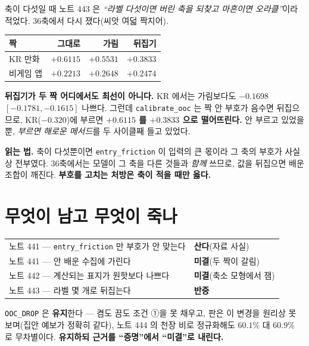 \documentclass[11pt]{article}
\begin{document}
축이 다섯일 때 노트 443 은 \emph{``라벨 다섯이면 버린 축을 되찾고 마흔이면
오라클''}이라 적었다. 36축에서 다시 쟀다(씨앗 여덟 짝지어).

\begin{center}
\begin{tabular}{lrrr}
\hline
짝 & 그대로 & 가림 & 뒤집기 \\
\hline
KR 만화 & $\mathbf{+0.6115}$ & $+0.5531$ & $+0.3833$ \\
비게임 앱 & $+0.2213$ & $\mathbf{+0.2648}$ & $+0.2474$ \\
\hline
\end{tabular}
\end{center}

\textbf{뒤집기가 두 짝 어디에서도 최선이 아니다.} KR 에서는 가림보다도
$-0.1698$ $[-0.1781,-0.1615]$ 나쁘다. 그런데 \texttt{calibrate\_ooc} 는
짝 안 부호가 음수면 뒤집으므로, KR($-0.320$)에 부르면
\textbf{$+0.6115$ 를 $+0.3833$ 으로 떨어뜨린다.} 안 부르고 있었을 뿐,
\emph{부르면 해로운 메서드}를 두 사이클째 들고 있었다.

\textbf{읽는 법.} 축이 다섯뿐이면 \texttt{entry\_friction} 이 입력의 큰
몫이라 그 축의 부호가 사실상 전부였다. 36축에서는 모델이 그 축을 다른
것들과 \emph{함께} 쓰므로, 값을 뒤집으면 배운 조합이 깨진다. \textbf{부호를
고치는 처방은 축이 적을 때만 옳다.}

\section{무엇이 남고 무엇이 죽나}

\begin{center}
\begin{tabular}{ll}
\hline
노트 441 --- \texttt{entry\_friction} 만 부호가 안 맞는다 & \textbf{산다}(자료 사실) \\
노트 441 --- 안 배운 수집에 가린다 & \textbf{미결}(두 짝이 갈림) \\
노트 442 --- 계산되는 표지가 원핫보다 나쁘다 & \textbf{미결}(축소 모형에서 잼) \\
노트 443 --- 라벨 몇 개로 뒤집는다 & \textbf{반증} \\
\hline
\end{tabular}
\end{center}

\texttt{OOC\_DROP} 은 \textbf{유지}한다 --- 켬도 끔도 조건 ①을 못 채우고,
판은 이 변경을 원리상 못 보며(집안 예보가 정확히 같다), 노트 444 의
천장 비로 정규화해도 $60.1\%$ 대 $60.9\%$ 로 무차별이다. \textbf{유지하되
근거를 ``증명''에서 ``미결''로 내린다.}
\end{document}
